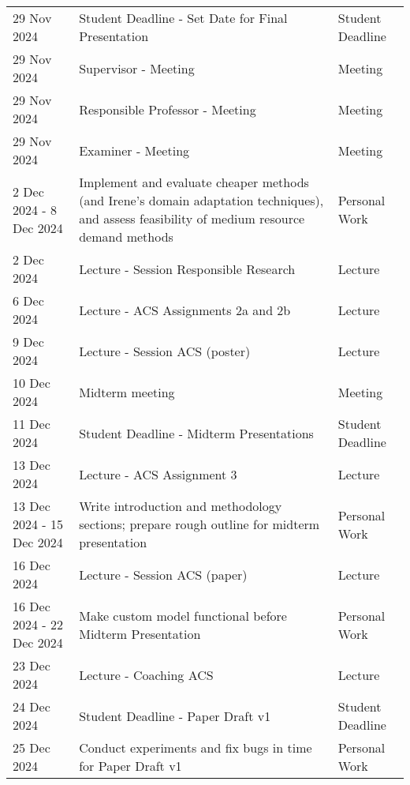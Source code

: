 \documentclass[
]{article}
\begin{document}
\begin{longtable}{p{} p{} p{}}
29 Nov 2024 & Student Deadline - Set Date for Final Presentation & Student Deadline \\

29 Nov 2024 & Supervisor - Meeting & Meeting \\

29 Nov 2024 & Responsible Professor - Meeting & Meeting \\

29 Nov 2024 & Examiner - Meeting & Meeting \\

2 Dec 2024 - 8 Dec 2024 & Implement and evaluate cheaper methods (and Irene's domain adaptation techniques), and assess feasibility of medium resource demand methods & Personal Work \\

2 Dec 2024 & Lecture - Session Responsible Research & Lecture \\

6 Dec 2024 & Lecture - ACS Assignments 2a and 2b & Lecture \\

9 Dec 2024 & Lecture - Session ACS (poster) & Lecture \\

10 Dec 2024 & Midterm meeting & Meeting \\

11 Dec 2024 & Student Deadline - Midterm Presentations & Student Deadline \\

13 Dec 2024 & Lecture - ACS Assignment 3 & Lecture \\

13 Dec 2024 - 15 Dec 2024 & Write introduction and methodology sections; prepare rough outline for midterm presentation & Personal Work \\

16 Dec 2024 & Lecture - Session ACS (paper) & Lecture \\

16 Dec 2024 - 22 Dec 2024 & Make custom model functional before Midterm Presentation & Personal Work \\

23 Dec 2024 & Lecture - Coaching ACS & Lecture \\

24 Dec 2024 & Student Deadline - Paper Draft v1 & Student Deadline \\

25 Dec 2024 & Conduct experiments and fix bugs in time for Paper Draft v1 & Personal Work \\


\end{longtable}
\end{document}
